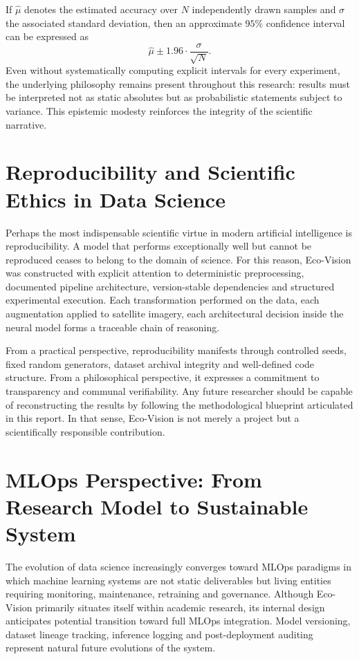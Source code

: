 \documentclass[12pt,a4paper]{report}
\begin{document}
If \( \hat{\mu} \) denotes the estimated accuracy over \(N\) independently drawn samples and \( \sigma \) the associated standard deviation, then an approximate \(95\%\) confidence interval can be expressed as
\[
\hat{\mu} \pm 1.96 \cdot \frac{\sigma}{\sqrt{N}}.
\]
Even without systematically computing explicit intervals for every experiment, the underlying philosophy remains present throughout this research: results must be interpreted not as static absolutes but as probabilistic statements subject to variance. This epistemic modesty reinforces the integrity of the scientific narrative.

\section{Reproducibility and Scientific Ethics in Data Science}

Perhaps the most indispensable scientific virtue in modern artificial intelligence is reproducibility. A model that performs exceptionally well but cannot be reproduced ceases to belong to the domain of science. For this reason, Eco-Vision was constructed with explicit attention to deterministic preprocessing, documented pipeline architecture, version-stable dependencies and structured experimental execution. Each transformation performed on the data, each augmentation applied to satellite imagery, each architectural decision inside the neural model forms a traceable chain of reasoning.

From a practical perspective, reproducibility manifests through controlled seeds, fixed random generators, dataset archival integrity and well-defined code structure. From a philosophical perspective, it expresses a commitment to transparency and communal verifiability. Any future researcher should be capable of reconstructing the results by following the methodological blueprint articulated in this report. In that sense, Eco-Vision is not merely a project but a scientifically responsible contribution.

\section{MLOps Perspective: From Research Model to Sustainable System}

The evolution of data science increasingly converges toward MLOps paradigms in which machine learning systems are not static deliverables but living entities requiring monitoring, maintenance, retraining and governance. Although Eco-Vision primarily situates itself within academic research, its internal design anticipates potential transition toward full MLOps integration. Model versioning, dataset lineage tracking, inference logging and post-deployment auditing represent natural future evolutions of the system.
\end{document}
